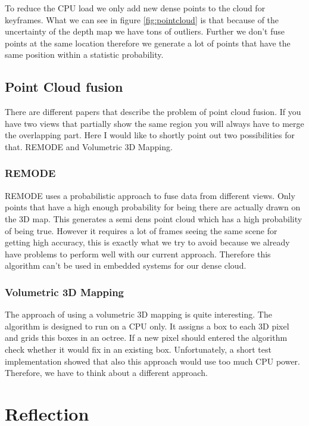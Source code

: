 \documentclass[11pt,a4paper,titlepage,oneside]{report}
\begin{document}
To reduce the CPU load we only add new dense points to the cloud for keyframes. What we can see in figure \ref{fig:pointcloud} is that because of the uncertainty of the depth map we have tons of outliers. Further we don't fuse points at the same location therefore we generate a lot of points that have the same position within a statistic probability.

\section{Point Cloud fusion}

There are different papers that describe the problem of point cloud fusion. If you have two views that partially show the same region you will always have to merge the overlapping part. Here I would like to shortly point out two possibilities for that. REMODE and Volumetric 3D Mapping.

\subsection{REMODE}

REMODE uses a probabilistic approach to fuse data from different views. Only points that have a high enough probability for being there are actually drawn on the 3D map. This generates a semi dens point cloud which has a high probability of being true. However it requires a lot of frames seeing the same scene for getting high accuracy, this is exactly what we try to avoid because we already have problems to perform well with our current approach. Therefore this algorithm can't be used in embedded systems for our dense cloud.

\subsection{Volumetric 3D Mapping}

The approach of using a volumetric 3D mapping is quite interesting. The algorithm is designed to run on a CPU only. It assigns a box to each 3D pixel and grids this boxes in an octree. If a new pixel should entered the algorithm check whether it would fix in an existing box. Unfortunately, a short test implementation showed that also this approach would use too much CPU power. Therefore, we have to think about a different approach.

\chapter{Reflection}
\end{document}
